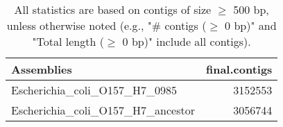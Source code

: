 \documentclass[12pt,a4paper]{article}
\begin{document}
\begin{table}[ht]
\begin{center}
\caption{All statistics are based on contigs of size $\geq$ 500 bp, unless otherwise noted (e.g., "\# contigs ($\geq$ 0 bp)" and "Total length ($\geq$ 0 bp)" include all contigs).}
\begin{tabular}{|l*{1}{|r}|}
\hline
Assemblies & final.contigs \\ \hline
Escherichia\_coli\_O157\_H7\_0985 & 3152553 \\ \hline
Escherichia\_coli\_O157\_H7\_ancestor & 3056744 \\ \hline
\end{tabular}
\end{center}
\end{table}
\end{document}
